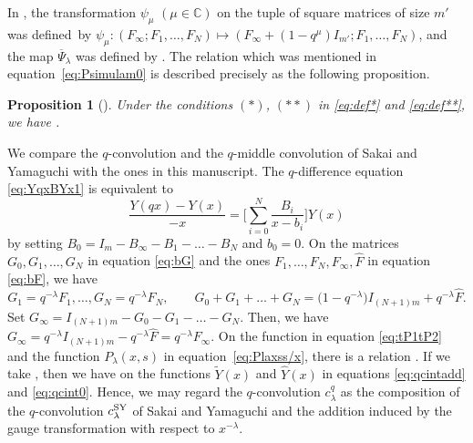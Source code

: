 \documentclass[pdftex]{sigma}
\numberwithin{equation}{section}
\newtheorem{Proposition}[Theorem]{Proposition}
\theoremstyle{definition}
\begin{document}
In \cite{SY}, the transformation $\psi _{\mu } $ $(\mu \in \mathbb{C} )$ on the tuple of square matrices of size $m'$ was defined~by
$
 \psi _{\mu }\colon ( F_{\infty } ; F_{1} ,\dots ,F_N ) \mapsto ( F_{\infty } +(1- q^{\mu }) I_{m'} ; F_{1} ,\dots ,F_N )$,
and the map $\overline{\Psi }_{\lambda } $ was defined by
.
The relation which was mentioned in equation~\eqref{eq:Psimulam0} is described precisely as the following proposition.
\begin{Proposition}[{\cite[Proposition 4.12]{SY}}]
Under the conditions $(*)$, $(**)$ in \eqref{eq:def*} and \eqref{eq:def**}, we have
.
\end{Proposition}
We compare the $q$-convolution and the $q$-middle convolution of Sakai and Yamaguchi with the ones in this manuscript.
The $q$-difference equation \eqref{eq:YqxBYx1} is equivalent to
\begin{equation*}
\frac{Y(q x) - Y(x )}{-x} = \Biggl[ \sum^{N}_{i = 0}\frac{B_{i}}{x -b_{i}} \Biggr] Y(x)
\end{equation*}
by setting $B_0 = I_m - B_\infty - B_{1} - \dots -B_N$ and $b_0=0$.
On the matrices $G_0 ,G_1 , \dots , G_N $ in equation \eqref{eq:bG} and the ones $F_1, \dots , F_N , F_\infty , \widehat{F}$ in equation \eqref{eq:bF}, we have
\begin{equation*}
 G_1 = q^{-\lambda } F_1 , \dots , G_N = q^{-\lambda } F_N , \qquad G_0 +G_1 + \dots + G_N = \bigl(1-q^{-\lambda }\bigr) I_{(N+1)m} + q^{-\lambda } \widehat{F}.
\end{equation*}
Set $G_{\infty} = I_{(N+1)m} - G_0 - G_1 - \dots - G_N $.
Then, we have $
G_{\infty} = q^{-\lambda } I_{(N+1)m}- q^{-\lambda } \widehat{F} = q^{-\lambda } F_{\infty} $.
On the function  in equation \eqref{eq:tP1tP2} and the function $ P_{\lambda}(x, s) $ in equation~\eqref{eq:Plaxss/x}, there is a relation
.
If we take , then we have  on the functions $\widetilde{Y}(x) $ and $\widehat{Y} (x)$ in equations \eqref{eq:qcintadd} and \eqref{eq:qcint0}.
Hence, we may regard the $q$-convolution $c^{q} _{\lambda} $ as the composition of the $q$-convolution $c^{\rm SY} _{\lambda} $ of Sakai and Yamaguchi and the addition induced by the gauge transformation with respect to $x^{-\lambda }$.
\end{document}
